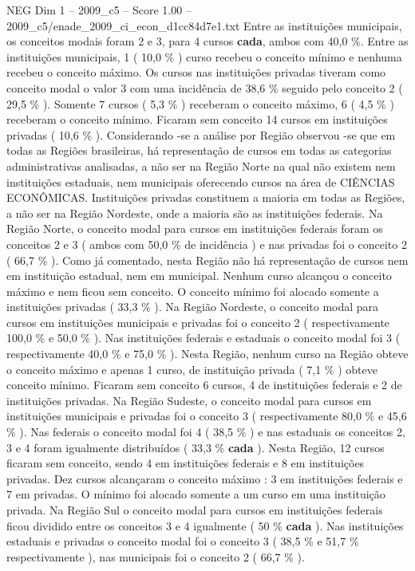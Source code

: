 \begin{textsample}{NEG Dim 1 – 2009\_c5 – Score 1.00 – 2009\_c5/enade\_2009\_ci\_econ\_d1cc84d7e1.txt}
Entre as instituições municipais, os conceitos modais foram 2 e 3, para 4 cursos \textbf{cada}, ambos com 40,0 \%.
Entre as instituições municipais, 1 ( 10,0 \% ) curso recebeu o conceito mínimo e nenhuma recebeu o conceito máximo.
Os cursos nas instituições privadas tiveram como conceito modal o valor 3 com uma incidência de 38,6 \% seguido pelo conceito 2 ( 29,5 \% ).
Somente 7 cursos ( 5,3 \% ) receberam o conceito máximo, 6 ( 4,5 \% ) receberam o conceito mínimo.
Ficaram sem conceito 14 cursos em instituições privadas ( 10,6 \% ).
Considerando -se a análise por Região observou -se que em todas as Regiões brasileiras, há representação de cursos em todas as categorias administrativas analisadas, a não ser na Região Norte na qual não existem nem instituições estaduais, nem municipais oferecendo cursos na área de CIÊNCIAS ECONÔMICAS.
Instituições privadas constituem a maioria em todas as Regiões, a não ser na Região Nordeste, onde a maioria são as instituições federais.
Na Região Norte, o conceito modal para cursos em instituições federais foram os conceitos 2 e 3 ( ambos com 50,0 \% de incidência ) e nas privadas foi o conceito 2 ( 66,7 \% ).
Como já comentado, nesta Região não há representação de cursos nem em instituição estadual, nem em municipal.
Nenhum curso alcançou o conceito máximo e nem ficou sem conceito.
O conceito mínimo foi alocado somente a instituições privadas ( 33,3 \% ).
Na Região Nordeste, o conceito modal para cursos em instituições municipais e privadas foi o conceito 2 ( respectivamente 100,0 \% e 50,0 \% ).
Nas instituições federais e estaduais o conceito modal foi 3 ( respectivamente 40,0 \% e 75,0 \% ).
Nesta Região, nenhum curso na Região obteve o conceito máximo e apenas 1 curso, de instituição privada ( 7,1 \% ) obteve conceito mínimo.
Ficaram sem conceito 6 cursos, 4 de instituições federais e 2 de instituições privadas.
Na Região Sudeste, o conceito modal para cursos em instituições municipais e privadas foi o conceito 3 ( respectivamente 80,0 \% e 45,6 \% ).
Nas federais o conceito modal foi 4 ( 38,5 \% ) e nas estaduais os conceitos 2, 3 e 4 foram igualmente distribuídos ( 33,3 \% \textbf{cada} ).
Nesta Região, 12 cursos ficaram sem conceito, sendo 4 em instituições federais e 8 em instituições privadas.
Dez cursos alcançaram o conceito máximo : 3 em instituições federais e 7 em privadas.
O mínimo foi alocado somente a um curso em uma instituição privada.
Na Região Sul o conceito modal para cursos em instituições federais ficou dividido entre os conceitos 3 e 4 igualmente ( 50 \% \textbf{cada} ).
Nas instituições estaduais e privadas o conceito modal foi o conceito 3 ( 38,5 \% e 51,7 \% respectivamente ), nas municipais foi o conceito 2 ( 66,7 \% ).

\end{textsample}
